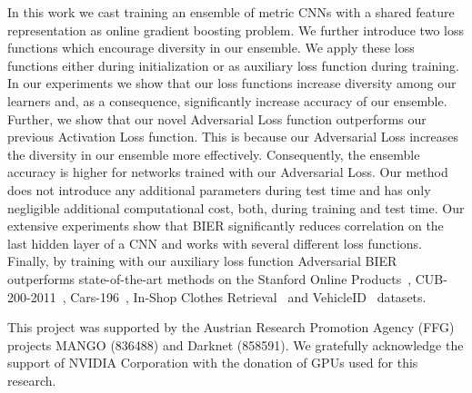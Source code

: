 \documentclass[10pt,journal,compsoc]{IEEEtran}
\begin{document}
In this work we cast training an ensemble of metric \acp{CNN} with a shared
feature representation as online gradient boosting problem.  We further
introduce two loss functions which encourage diversity in our ensemble. We apply these loss functions either during initialization or as auxiliary loss function during training.
In our experiments we show that our loss functions increase
diversity among our learners and, as a consequence, significantly increase
accuracy of our ensemble. Further, we show that our novel Adversarial
Loss function outperforms our previous Activation Loss function. This is because our 
Adversarial Loss increases the diversity in our ensemble more effectively. Consequently, the ensemble accuracy is higher for networks trained 
with our Adversarial Loss.
Our method does not
introduce any additional parameters during test time and has only negligible
additional computational cost, both, during training and test time.  Our extensive experiments show
that \ac{BIER} significantly reduces correlation on the last hidden layer of a
\ac{CNN} and works with  several different loss functions. Finally, by training
with our auxiliary loss function Adversarial \ac{BIER} outperforms
state-of-the-art methods on the Stanford Online Products~\cite{oh2016deep},
CUB-200-2011~\cite{WahCUB_200_2011}, Cars-196~\cite{krause20133d}, In-Shop
Clothes Retrieval~\cite{liu2016deepfashion} and VehicleID~\cite{liu2016deep}
datasets.

\ifCLASSOPTIONcompsoc%

This project was supported by the Austrian Research Promotion Agency (FFG) projects MANGO (836488) and Darknet (858591). We gratefully acknowledge the support of NVIDIA Corporation with the donation of GPUs used for this research.
\end{document}
